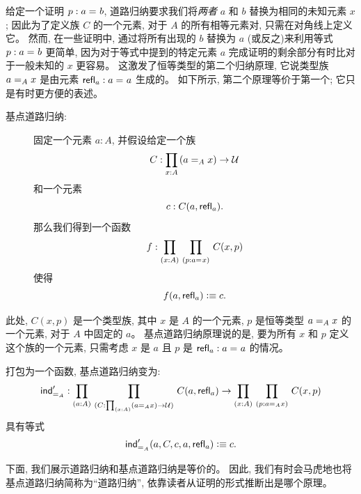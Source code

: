 \mentalpause

给定一个证明 $p : \id{a}{b}$, 道路归纳要求我们将\emph{两者} $a$ 和 $b$ 替换为相同的未知元素 $x$; 因此为了定义族 $C$ 的一个元素, 对于 $A$ 的所有相等元素对, 只需在对角线上定义它。
然而, 在一些证明中, 通过将所有出现的 $b$ 替换为 $a$ (或反之)来利用等式 $p : \id{a}{b}$ 更简单, 因为对于等式中提到的特定元素 $a$ 完成证明的剩余部分有时比对于一般未知的 $x$ 更容易。
这激发了恒等类型的第二个归纳原理, 它说类型族 $\id[A]{a}{x}$ 是由元素 $\refl{a} : \id{a}{a}$ 生成的。
如下所示, 第二个原理等价于第一个; 它只是有时更方便的表述。

%
%
\begin{description}
\item[基点道路归纳:]
固定一个元素 $a:A$, 并假设给定一个族
\[ C : \prd{x:A} (\id[A]{a}{x}) \to \UU \]
和一个元素
\[ c : C(a,\refl{a}). \]
那么我们得到一个函数
\[ f : \prd{x:A}{p:\id{a}{x}} C(x,p) \]
使得
\[ f(a,\refl{a}) \defeq c.\]
\end{description}

此处, $C(x,p)$ 是一个类型族, 其中 $x$ 是 $A$ 的一个元素, $p$ 是恒等类型 $\id[A]{a}{x}$ 的一个元素, 对于 $A$ 中固定的 $a$。
基点道路归纳原理说的是, 要为所有 $x$ 和 $p$ 定义这个族的一个元素, 只需考虑 $x$ 是 $a$ 且 $p$ 是 $\refl{a} : \id{a}{a}$ 的情况。

打包为一个函数, 基点道路归纳变为:
%
\begin{align*}
  \indidb{A} :  \dprd{a:A}{C : \prd{x:A} (\id[A]{a}{x}) \to \UU}
  C(a,\refl{a}) \to \dprd{x:A}{p : \id[A]{a}{x}} C(x,p) 
\end{align*}
具有等式
\[ \indidb{A}(a,C,c,a,\refl{a}) \defeq c. \]

下面, 我们展示道路归纳和基点道路归纳是等价的。
因此, 我们有时会马虎地也将基点道路归纳简称为``道路归纳'', 依靠读者从证明的形式推断出是哪个原理。

